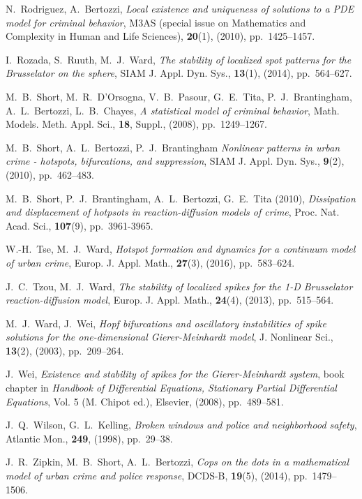 \documentclass{article}%
\begin{document}
\begin{thebibliography}{99}
 N.~Rodriguez, A.~Bertozzi, \textit{Local existence and
  uniqueness of solutions to a PDE model for criminal behavior}, M3AS
  (special issue on Mathematics and Complexity in Human and Life
  Sciences), \textbf{20}(1), (2010), pp.~1425--1457.

 I.~Rozada, S.~Ruuth, M.~J.~Ward, \textit{The stability of
 localized spot patterns for the Brusselator on the sphere}, SIAM J. Appl. 
Dyn. Sys., \textbf{13}(1), (2014), pp.~564--627.

 M.~B.~Short, M.~R.~D'Orsogna, V.~B.~Pasour, G.~E.~Tita,
  P.~J.~Brantingham, A.~L.~Bertozzi, L.~B.~Chayes, \textit{A
    statistical model of criminal behavior}, Math. Models. Meth. Appl.
  Sci., \textbf{18}, Suppl., (2008), pp.~1249--1267.

 M.~B.~Short, A.~L.~Bertozzi, P.~J.~Brantingham
  \textit{Nonlinear patterns in urban crime - hotspots, bifurcations,
    and suppression}, SIAM J. Appl. Dyn. Sys., \textbf{9}(2), (2010),
  pp.~462--483.

 M.~B.~Short, P.~J.~Brantingham, A.~L.~Bertozzi,
  G.~E.~Tita (2010), \textit{Dissipation and displacement of hotpsots
    in reaction-diffusion models of crime}, Proc. Nat. Acad. Sci.,
  \textbf{107}(9), pp.~3961-3965.

 W.-H.~Tse, M.~J.~Ward, \textit{Hotspot formation and
  dynamics for a continuum model of urban crime},
  Europ. J. Appl. Math., \textbf{27}(3), (2016), pp.~583--624.

 J.~C.~Tzou, M.~J.~Ward, \textit{The stability of localized
spikes for the 1-D Brusselator reaction-diffusion model}, Europ. J. Appl.
Math., \textbf{24}(4), (2013), pp.~515--564.

 M.~J.~Ward, J.~Wei, \textit{Hopf bifurcations and
  oscillatory instabilities of spike solutions for the one-dimensional
  Gierer-Meinhardt model}, J. Nonlinear Sci., \textbf{13}(2), (2003),
  pp.~209--264.

 J.~Wei, \textit{Existence and stability
of spikes for the Gierer-Meinhardt system}, book chapter in \textit{Handbook
of Differential Equations, Stationary Partial Differential Equations},
Vol. 5 (M. Chipot ed.), Elsevier, (2008), pp.~489--581.

 J.~Q.~Wilson, G.~L.~Kelling, \textit{Broken windows and
  police and neighborhood safety}, Atlantic Mon., \textbf{249},
  (1998), pp.~29--38.

 J.~R.~Zipkin, M.~B.~Short, A.~L.~Bertozzi,
  \textit{Cops on the dots in a mathematical model of urban crime and
    police response}, DCDS-B, \textbf{19}(5), (2014), pp.~1479--1506.

\end{thebibliography}
\end{document}
